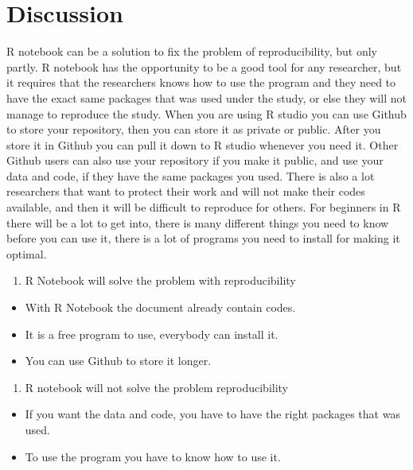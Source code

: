 \documentclass[
  12pt,
  norsk,
]{article}
\providecommand{\tightlist}{%
  \setlength{\itemsep}{0pt}\setlength{\parskip}{0pt}}
\begin{document}
\hypertarget{discussion}{%
\section{Discussion}\label{discussion}}

R notebook can be a solution to fix the problem of reproducibility, but
only partly. R notebook has the opportunity to be a good tool for any
researcher, but it requires that the researchers knows how to use the
program and they need to have the exact same packages that was used
under the study, or else they will not manage to reproduce the study.
When you are using R studio you can use Github to store your repository,
then you can store it as private or public. After you store it in Github
you can pull it down to R studio whenever you need it. Other Github
users can also use your repository if you make it public, and use your
data and code, if they have the same packages you used. There is also a
lot researchers that want to protect their work and will not make their
codes available, and then it will be difficult to reproduce for others.
For beginners in R there will be a lot to get into, there is many
different things you need to know before you can use it, there is a lot
of programs you need to install for making it optimal.

\begin{enumerate}
\def\labelenumi{\arabic{enumi}.}
\tightlist
\item
  R Notebook will solve the problem with reproducibility
\end{enumerate}

\begin{itemize}
\tightlist
\item
  With R Notebook the document already contain codes.
\item
  It is a free program to use, everybody can install it.
\item
  You can use Github to store it longer.
\end{itemize}

\begin{enumerate}
\def\labelenumi{\arabic{enumi}.}
\setcounter{enumi}{1}
\tightlist
\item
  R notebook will not solve the problem reproducibility
\end{enumerate}

\begin{itemize}
\tightlist
\item
  If you want the data and code, you have to have the right packages
  that was used.\\
\item
  To use the program you have to know how to use it.
\end{itemize}
\end{document}
